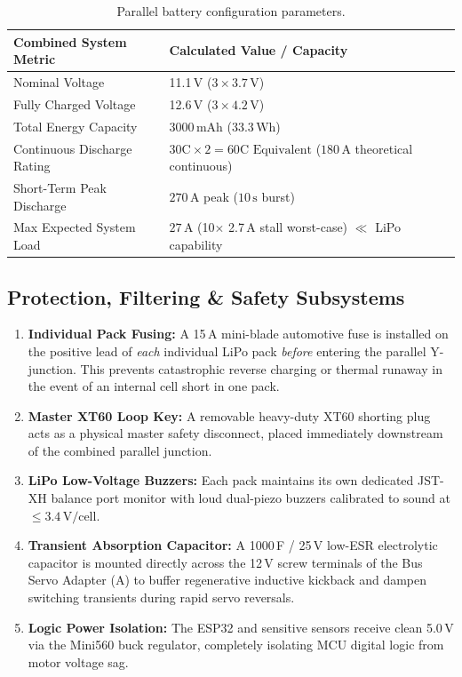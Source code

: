 \documentclass[11pt,a4paper]{article}
\begin{document}
\begin{table}[h!]
\centering
\small
\renewcommand{\arraystretch}{1.2}
\begin{tabularx}{\textwidth}{l X}
\toprule
\textbf{Combined System Metric} & \textbf{Calculated Value / Capacity} \\
\midrule
Nominal Voltage & 11.1\,V ($3 \times 3.7\,\text{V}$) \\
Fully Charged Voltage & 12.6\,V ($3 \times 4.2\,\text{V}$) \\
Total Energy Capacity & $3000\,\text{mAh}$ ($33.3\,\text{Wh}$) \\
Continuous Discharge Rating & $30\text{C} \times 2 = 60\text{C Equivalent}$ ($180\,\text{A}$ theoretical continuous) \\
Short-Term Peak Discharge & $270\,\text{A}$ peak ($10\,\text{s}$ burst) \\
Max Expected System Load & $27\,\text{A}$ (10$\times$ 2.7\,A stall worst-case) $\ll$ LiPo capability \\
\bottomrule
\end{tabularx}
\caption{Parallel battery configuration parameters.}
\end{table}

\subsection{Protection, Filtering \& Safety Subsystems}
\begin{enumerate}[leftmargin=1.5em, itemsep=0.3em]
    \item \textbf{Individual Pack Fusing:} A 15\,A mini-blade automotive fuse is installed on the positive lead of \textit{each} individual LiPo pack \textit{before} entering the parallel Y-junction. This prevents catastrophic reverse charging or thermal runaway in the event of an internal cell short in one pack.
    \item \textbf{Master XT60 Loop Key:} A removable heavy-duty XT60 shorting plug acts as a physical master safety disconnect, placed immediately downstream of the combined parallel junction.
    \item \textbf{LiPo Low-Voltage Buzzers:} Each pack maintains its own dedicated JST-XH balance port monitor with loud dual-piezo buzzers calibrated to sound at $\le 3.4\,\text{V}/\text{cell}$.
    \item \textbf{Transient Absorption Capacitor:} A 1000\,\textmu F / 25\,V low-ESR electrolytic capacitor is mounted directly across the 12\,V screw terminals of the Bus Servo Adapter (A) to buffer regenerative inductive kickback and dampen switching transients during rapid servo reversals.
    \item \textbf{Logic Power Isolation:} The ESP32 and sensitive sensors receive clean 5.0\,V via the Mini560 buck regulator, completely isolating MCU digital logic from motor voltage sag.
\end{enumerate}
\end{document}
